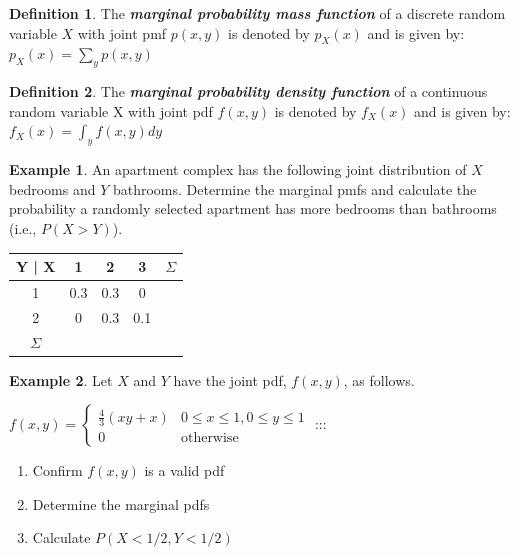 \documentclass[
  11pt,
  oneside]{book}
\providecommand{\tightlist}{%
  \setlength{\itemsep}{0pt}\setlength{\parskip}{0pt}}
\theoremstyle{definition}
\newtheorem{definition}{Definition}[chapter]
\theoremstyle{definition}
\newtheorem{example}{Example}[chapter]
\theoremstyle{definition}
\theoremstyle{definition}
\theoremstyle{remark}
\begin{document}
\begin{definition}
The \textbf{\emph{marginal probability mass function}} of a discrete random variable \(X\) with joint pmf \(p(x,y)\) is denoted by \(p_X(x)\) and is given by: \(p_X(x) = \sum_y p(x,y)\)
\end{definition}

\begin{definition}
The \textbf{\emph{marginal probability density function}} of a continuous random variable X with joint pdf \(f(x,y)\) is denoted by \(f_X(x)\) and is given by: \(f_X(x) = \int_y f(x,y) dy\)
\end{definition}

\begin{example}
An apartment complex has the following joint distribution of \(X\) bedrooms and \(Y\) bathrooms. Determine the marginal pmfs and calculate the probability a randomly selected apartment has more bedrooms than bathrooms (i.e., \(P(X>Y)\)).
\end{example}

\begin{table}[!h]
\centering
\begin{tabular}{c|c|c|c|c}
\hline
Y | X & 1 & 2 & 3 & $\Sigma$\\
\hline
1 & 0.3 & 0.3 & 0 & \\
\hline
2 & 0 & 0.3 & 0.1 & \\
\hline
$\Sigma$ &  &  &  & \\
\hline
\end{tabular}
\end{table}

\newpage

\begin{example}
Let \(X\) and \(Y\) have the joint pdf, \(f(x,y)\), as follows.
\end{example}

\(f(x,y) = \begin{cases} \frac{4}{3}(xy + x) & 0 \leq x \leq 1, 0 \leq y \leq 1\\
0 & \text{otherwise}
\end{cases}\)
:::

\begin{enumerate}
\def\labelenumi{(\alph{enumi})}
\tightlist
\item
  Confirm \(f(x,y)\) is a valid pdf
\item
  Determine the marginal pdfs
\item
  Calculate \(P(X<1/2,Y<1/2)\)
\end{enumerate}
\end{document}
